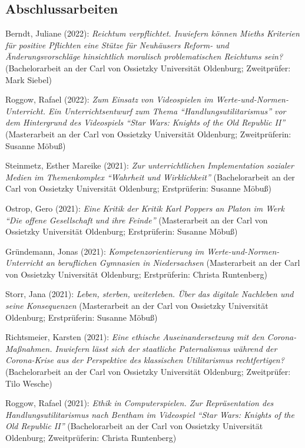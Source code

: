 \documentclass[a4paper,10pt]{article}
\newenvironment{literature}{%
   \parskip6pt\parindent0pt\raggedright
   \def\lititem{\hangindent=1cm\hangafter1}}{%
   \par\ignorespaces}
\begin{document}
\subsection*{Abschlussarbeiten}
\begin{literature}
\lititem Berndt, Juliane (2022): \textit{Reichtum verpflichtet. Inwiefern können Mieths Kriterien für positive Pflichten eine Stütze für Neuhäusers Reform- und Änderungsvorschläge hinsichtlich moralisch problematischen Reichtums sein?} (Bachelorarbeit an der Carl von Ossietzky Universität Oldenburg; Zweitprüfer: Mark Siebel)

\lititem Roggow, Rafael (2022): \textit{Zum Einsatz von Videospielen im Werte-und-Normen-Unterricht. Ein Unterrichtsentwurf zum Thema \enquote{Handlungsutilitarismus} vor dem Hintergrund des Videospiels \enquote{Star Wars: Knights of the Old Republic II}} (Masterarbeit an der Carl von Ossietzky Universität Oldenburg; Zweitprüferin: Susanne Möbuß)

\lititem Steinmetz, Esther Mareike (2021): \textit{Zur unterrichtlichen Implementation sozialer Medien im Themenkomplex \enquote{Wahrheit und Wirklichkeit}} (Bachelorarbeit an der Carl von Ossietzky Universität Oldenburg; Erstprüferin: Susanne Möbuß)

\lititem Ostrop, Gero (2021): \textit{Eine Kritik der Kritik Karl Poppers an Platon im Werk \enquote{Die offene Gesellschaft und ihre Feinde}} (Masterarbeit an der Carl von Ossietzky Universität Oldenburg; Erstprüferin: Susanne Möbuß)

\lititem Gründemann, Jonas (2021): \textit{Kompetenzorientierung im Werte-und-Normen-Unterricht an beruflichen Gymnasien in Niedersachsen} (Masterarbeit an der Carl von Ossietzky Universität Oldenburg; Erstprüferin: Christa Runtenberg)

\lititem Storr, Jana (2021): \textit{Leben, sterben, weiterleben. Über das digitale Nachleben und seine Konsequenzen} (Masterarbeit an der Carl von Ossietzky Universität Oldenburg; Erstprüferin: Susanne Möbuß)

\lititem Richtsmeier, Karsten (2021): \textit{Eine ethische Auseinandersetzung mit den Corona-Maßnahmen. Inwiefern lässt sich der staatliche Paternalismus während der Corona-Krise aus der Perspektive des klassischen Utilitarismus rechtfertigen?} (Bachelorarbeit an der Carl von Ossietzky Universität Oldenburg; Zweitprüfer: Tilo Wesche)

\lititem Roggow, Rafael (2021): \textit{Ethik in Computerspielen. Zur Repräsentation des Handlungsutilitarismus nach Bentham im Videospiel \enquote{Star Wars: Knights of the Old Republic II}} (Bachelorarbeit an der Carl von Ossietzky Universität Oldenburg; Zweitprüferin: Christa Runtenberg)


\end{literature}
\end{document}
